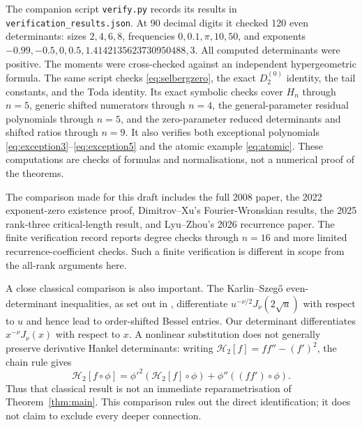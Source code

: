 \documentclass[11pt]{article}
\numberwithin{equation}{section}
\theoremstyle{remark}
\begin{document}
The companion script \texttt{verify.py} records its results in
\texttt{verification\_results.json}. At 90 decimal digits it checked
120 even determinants: sizes $2,4,6,8$, frequencies
$0,0.1,\pi,10,50$, and exponents
$-0.99,-0.5,0,0.5,1.4142135623730950488,3$.
All computed determinants were positive. The moments were cross-checked
against an independent hypergeometric formula. The same script checks
\eqref{eq:selbergzero}, the exact $D_2^{(0)}$ identity, the tail constants,
and the Toda identity. Its exact symbolic checks cover $H_n$ through
$n=5$, generic shifted numerators through $n=4$, the general-parameter
residual polynomials through $n=5$, and the zero-parameter reduced
determinants and shifted ratios through $n=9$. It also verifies both
exceptional polynomials \eqref{eq:exception3}--\eqref{eq:exception5} and the atomic
example \eqref{eq:atomic}. These computations are checks of formulas
and normalisations, not a numerical proof of the theorems.

The comparison made for this draft includes the full 2008 paper, the
2022 exponent-zero existence proof, Dimitrov--Xu's Fourier-Wronskian
results, the 2025 rank-three critical-length result, and Lyu--Zhou's
2026 recurrence paper. The finite verification record
\cite{Ideosphere2026} reports degree checks through $n=16$ and more
limited recurrence-coefficient checks. Such a finite verification is
different in scope from the all-rank arguments here.

A close classical comparison is also important. The Karlin--Szeg\H{o}
even-determinant inequalities, as set out in
\cite[Section~2.2]{BariczPogany2014}, differentiate
$u^{-\nu/2}J_\nu(2\sqrt u)$ with respect to $u$ and hence lead to
order-shifted Bessel entries. Our determinant differentiates
$x^{-\nu}J_\nu(x)$ with respect to $x$. A nonlinear substitution does
not generally preserve derivative Hankel determinants: writing
$\mathcal H_2[f]=ff''-(f')^2$, the chain rule gives
\[
 \mathcal H_2[f\circ\phi]
 =\phi'^2(\mathcal H_2[f]\circ\phi)
   +\phi''((ff')\circ\phi).
\]
Thus that classical result is not an immediate reparametrisation of
Theorem~\ref{thm:main}. This comparison rules out the direct
identification; it does not claim to exclude every deeper connection.
\end{document}

